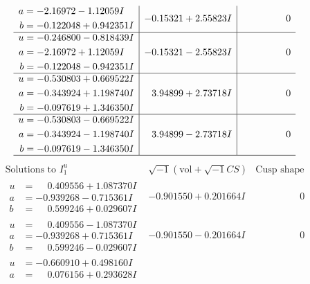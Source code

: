 \documentclass[1p]{elsarticle_modified}
\theoremstyle{definition}
\newcommand{\I}{\sqrt{-1}}
\begin{document}
$$\begin{array}{c|c|c}
\begin{aligned}
a &= -2.16972 - 1.12059 I \\
b &= -0.122048 + 0.942351 I\end{aligned}
 & -0.15321 + 2.55823 I & \phantom{-0.000000 } 0 \\ \hline\begin{aligned}
u &= -0.246800 - 0.818439 I \\
a &= -2.16972 + 1.12059 I \\
b &= -0.122048 - 0.942351 I\end{aligned}
 & -0.15321 - 2.55823 I & \phantom{-0.000000 } 0 \\ \hline\begin{aligned}
u &= -0.530803 + 0.669522 I \\
a &= -0.343924 + 1.198740 I \\
b &= -0.097619 + 1.346350 I\end{aligned}
 & \phantom{-}3.94899 + 2.73718 I & \phantom{-0.000000 } 0 \\ \hline\begin{aligned}
u &= -0.530803 - 0.669522 I \\
a &= -0.343924 - 1.198740 I \\
b &= -0.097619 - 1.346350 I\end{aligned}
 & \phantom{-}3.94899 - 2.73718 I & \phantom{-0.000000 } 0\\
 \hline 
 \end{array}$$\newpage$$\begin{array}{c|c|c}  
\text{Solutions to }I^u_{1}& \I (\text{vol} + \sqrt{-1}CS) & \text{Cusp shape}\\
 \hline 
\begin{aligned}
u &= \phantom{-}0.409556 + 1.087370 I \\
a &= -0.939268 - 0.715361 I \\
b &= \phantom{-}0.599246 + 0.029607 I\end{aligned}
 & -0.901550 + 0.201664 I & \phantom{-0.000000 } 0 \\ \hline\begin{aligned}
u &= \phantom{-}0.409556 - 1.087370 I \\
a &= -0.939268 + 0.715361 I \\
b &= \phantom{-}0.599246 - 0.029607 I\end{aligned}
 & -0.901550 - 0.201664 I & \phantom{-0.000000 } 0 \\ \hline\begin{aligned}
u &= -0.660910 + 0.498160 I \\
a &= \phantom{-}0.076156 + 0.293628 I \\

\end{aligned}
\end{array}$$
\end{document}
